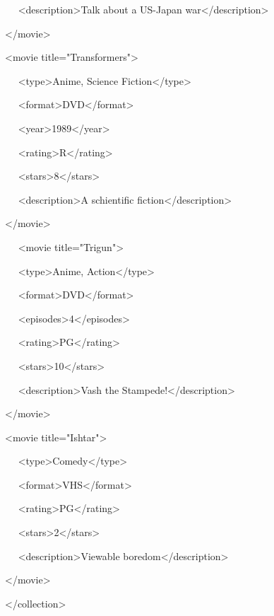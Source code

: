 \noindent 
~~ <description>Talk about a US-Japan war</description> \par
\noindent 
</movie> \par
\noindent 
<movie title="Transformers"> \par
\noindent 
~~ <type>Anime, Science Fiction</type> \par
\noindent 
~~ <format>DVD</format> \par
\noindent 
~~ <year>1989</year> \par
\noindent 
~~ <rating>R</rating> \par
\noindent 
~~ <stars>8</stars> \par
\noindent 
~~ <description>A schientific fiction</description> \par
\noindent 
</movie> \par
\noindent 
~~ <movie title="Trigun"> \par
\noindent 
~~ <type>Anime, Action</type> \par
\noindent 
~~ <format>DVD</format> \par
\noindent 
~~ <episodes>4</episodes> \par
\noindent 
~~ <rating>PG</rating> \par
\noindent 
~~ <stars>10</stars> \par
\noindent 
~~ <description>Vash the Stampede!</description> \par
\noindent 
</movie> \par
\noindent 
<movie title="Ishtar"> \par
\noindent 
~~ <type>Comedy</type> \par
\noindent 
~~ <format>VHS</format> \par
\noindent 
~~ <rating>PG</rating> \par
\noindent 
~~ <stars>2</stars> \par
\noindent 
~~ <description>Viewable boredom</description> \par
\noindent 
</movie> \par
\noindent 
</collection> \par

